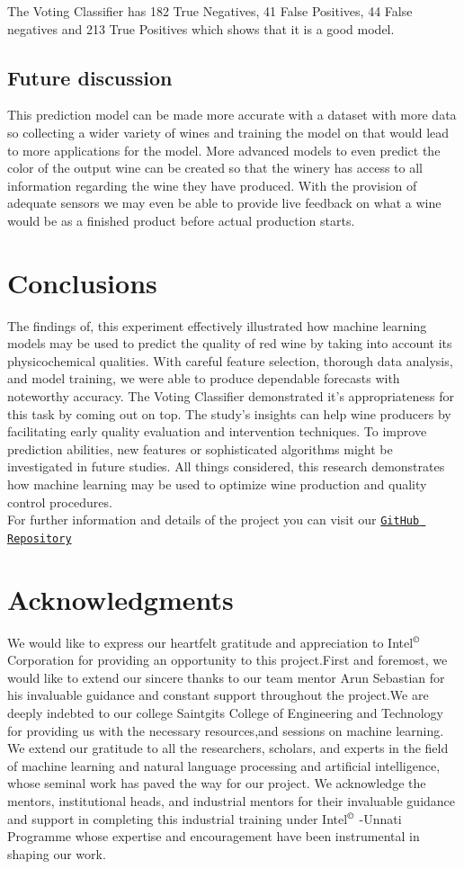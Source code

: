 \documentclass{article}
\begin{document}
The Voting Classifier has 182 True Negatives, 41 False Positives, 44 False negatives and 213 True Positives which shows that it is a good model.\\

\subsection{Future discussion}
This prediction model can be made more accurate with a dataset with more data so collecting a wider variety of wines and training the model on that would lead to more applications for the model.
More advanced models to even predict the color of the output wine can be created so that the winery has access to all information regarding the wine they have produced. With the provision of adequate sensors we may even be able to provide live feedback on what a wine would be as a finished product before actual production starts.

\section{Conclusions}
The findings of, this experiment effectively illustrated how machine learning models may be used to predict the quality of red wine by taking into account its physicochemical qualities. With careful feature selection, thorough data analysis, and model training, we were able to produce dependable forecasts with noteworthy accuracy. The Voting Classifier demonstrated it's appropriateness for this task by coming out on top. The study's insights can help wine producers by facilitating early quality evaluation and intervention techniques. To improve prediction abilities, new features or sophisticated algorithms might be investigated in future studies. All things considered, this research demonstrates how machine learning may be used to optimize wine production and quality control procedures.\\
For further information and details of the project you can visit our \href{https://github.com/VMOnGit/RedWineQuality}{{\texttt{GitHub Repository}}}

\section*{Acknowledgments}
We would like to express our heartfelt gratitude and appreciation to Intel$^\copyright$ Corporation for providing an opportunity to this project.First and foremost, we would like to extend our sincere thanks to our team mentor Arun Sebastian for his invaluable guidance and constant support throughout the project.We are deeply indebted to our college Saintgits College of Engineering and Technology for providing us with the necessary resources,and sessions on machine learning. We extend our gratitude to all the researchers, scholars, and experts in the field of machine learning and natural language processing and artificial intelligence, whose seminal work has paved the way for our project. We acknowledge the mentors, institutional heads, and industrial mentors for their invaluable guidance and support in completing this industrial training under Intel$^\copyright$ -Unnati Programme whose expertise and encouragement have been instrumental in shaping our work.
‌
\end{document}
